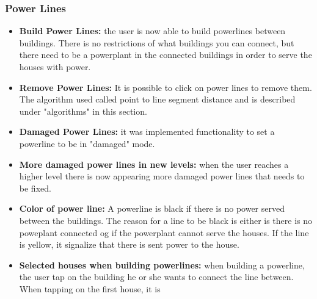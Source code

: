 	\subsubsection{Power Lines}
		\begin{itemize}
			\item {\bf Build Power Lines: } the user is now able to build powerlines
			between buildings. There is no restrictions of what buildings you can connect, 
			but there need to be a powerplant in the connected buildings in order to serve the houses 
			with power.
			\item {\bf Remove Power Lines: } It is possible to click on power 
			lines to remove them. The algorithm used called point to line segment 
			distance and is described under "algorithms" in this section. 
			\item {\bf Damaged Power Lines: } it was implemented functionality to set a 
			powerline to be in "damaged" mode. 
			\item {\bf More damaged power lines in new levels: } when the user reaches a higher level
			there is now appearing more damaged power lines that needs to be fixed. 
			\item {\bf Color of power line: } A powerline is black if there is no power served between
			the buildings. The reason for a line to be black is either is there is no poweplant
			connected og if the powerplant cannot serve the houses. If the line is yellow, it 
			signalize that there is sent power to the house. 
			\item {\bf Selected houses when building powerlines: } when building a powerline, 
			the user tap on the building he or she wants to connect the line between. When tapping on the
			first house, it is 
		\end{itemize}

